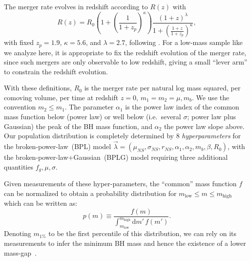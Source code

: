 \documentclass[modern]{aastex631}
\newcommand{\dd}{\ensuremath{\mathrm{d}}}
\begin{document}
The merger rate evolves in redshift according to $R(z)$ with 
\begin{equation}
    R(z) = R_0 \left( 1 + \left( \frac{1}{1 + z_p} \right)^\kappa \right) \frac{\left( 1 + z \right)^\lambda}{1 + \left( \frac{1+z}{1+z_p} \right)^\kappa}, 
\end{equation}
with fixed $z_p = 1.9$, $\kappa = 5.6$, and $\lambda = 2.7$, following
\citet{Madau2014}.  For a low-mass sample like we analyze here, it is
appropriate to fix the redshift evolution of the merger rate, since such mergers
are only observable to low redshift, giving a small ``lever arm'' to constrain
the redshift evolution.

With these definitions, $R_0$ is the merger rate per natural log mass squared,
per comoving volume, per time at redshift $z = 0$, $m_1 = m_2 = \mu, m_b$.  We
use the convention $m_2 \leq m_1$.  The parameter $\alpha_1$ is the power law
index of the common mass function below (power law) or well below (i.e.\ several
$\sigma$; power law plus Gaussian) the peak of the BH mass function, and
$\alpha_2$ the power law slope above.  Our population distribution is completely
determined by 8 \textit{hyperparameters} for the broken-power-law~(BPL) model
$\vec{\lambda}=(\mu_{NS}, \sigma_{NS}, r_{NS}, \alpha_1,\alpha_2,m_b, \beta,
R_0)$, with the broken-power-law+Gaussian~(BPLG) model requiring three
additional quantities $f_g,\mu,\sigma$.

Given measurements of these hyper-parameters, the ``common'' mass function $f$ can be normalized to obtain a probability distribution
for $m_\mathrm{low} \leq m \leq m_\mathrm{high}$ which can be written as:
\begin{equation}
    \label{eq:pm-definition}
    p(m) \equiv \frac{f(m)}{\int_{m_\mathrm{low}}^{m_\mathrm{high}} \dd m' \, f(m')}.
\end{equation}
\noindent Denoting $m_{1\%}$ to be the first percentile of this distribution, we can rely on its measurements to infer the minimum BH mass and hence the existence of a lower mass-gap~\citep{Farr:2010tu}. 
\end{document}
